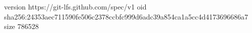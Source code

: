 version https://git-lfs.github.com/spec/v1
oid sha256:24353aec711590fe506c2378ccbfc999d6adc39a854ca1a5cc4d4173696686a7
size 786528
